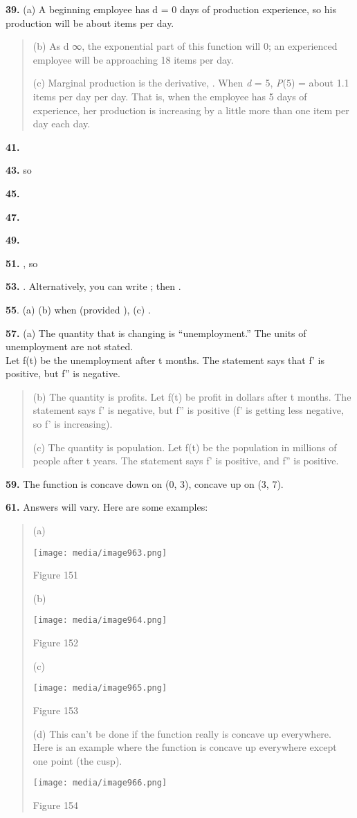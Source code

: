 \textbf{39.} (a) A beginning employee has d = 0 days of production
experience, so his production will be about items per day.

\begin{quote}
(b) As d ∞, the exponential part of this function will 0; an experienced
employee will be approaching 18 items per day.

(c) Marginal production is the derivative, . When \emph{d} = 5,
\emph{P}(5) = about 1.1 items per day per day. That is, when the
employee has 5 days of experience, her production is increasing by a
little more than one item per day each day.
\end{quote}

\textbf{41.}

\textbf{43.} so

\textbf{45.}

\textbf{47.}

\textbf{49.}

\textbf{51.} , so

\textbf{53.} . Alternatively, you can write ; then .

\textbf{55}. (a) (b) when (provided ), (c) .

\textbf{57.} (a) The quantity that is changing is ``unemployment.'' The
units of unemployment are not stated.\\
Let f(t) be the unemployment after t months. The statement says that f'
is positive, but f'' is negative.

\begin{quote}
(b) The quantity is profits. Let f(t) be profit in dollars after t
months. The statement says f' is negative, but f'' is positive (f' is
getting less negative, so f' is increasing).

(c) The quantity is population. Let f(t) be the population in millions
of people after t years. The statement says f' is positive, and f'' is
positive.
\end{quote}

\textbf{59.} The function is concave down on (0, 3), concave up on (3,
7).

\textbf{61.} Answers will vary. Here are some examples:

\begin{quote}
(a)

\texttt{[image: media/image963.png]}

Figure 151

(b)

\texttt{[image: media/image964.png]}

Figure 152

(c)

\texttt{[image: media/image965.png]}

Figure 153

(d) This can't be done if the function really is concave up everywhere.
Here is an example where the function is concave up everywhere except
one point (the cusp).

\texttt{[image: media/image966.png]}

Figure 154
\end{quote}

